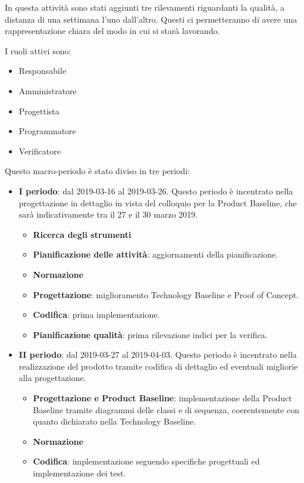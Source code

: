 		In questa attività sono stati aggiunti tre rilevamenti riguardanti la qualità, a distanza di una settimana l'uno
		dall'altro. Questi ci permetteranno di avere una rappresentazione chiara del modo in cui si starà lavorando.

        I ruoli attivi sono:
        \begin{itemize}
            \item Responsabile
            \item Amministratore
            \item Progettista
            \item Programmatore
            \item Verificatore
        \end{itemize}
        Questo macro-periodo è stato diviso in tre periodi:
		\begin{itemize}
			\item \textbf{I periodo}: dal 2019-03-16 al 2019-03-26. Questo periodo è incentrato nella progettazione in dettaglio
				in vista del colloquio per la Product Baseline, che sarà indicativamente tra il 27 e il 30 marzo 2019.
			\begin{itemize}
    	        \item \textbf{Ricerca degli strumenti}
    	        \item \textbf{Pianificazione delle attività}: aggiornamenti della pianificazione.
    	        \item \textbf{Normazione}
    	        \item \textbf{Progettazione}: miglioramento Technology Baseline e Proof of Concept.
    	        \item \textbf{Codifica}: prima implementazione.
    	        \item \textbf{Pianificazione qualità}: prima rilevazione indici per la verifica.
        	\end{itemize}
			\item \textbf{II periodo}: dal 2019-03-27 al 2019-04-03. Questo periodo è incentrato nella realizzazione del prodotto tramite
				codifica di dettaglio ed eventuali migliorie alla progettazione.
			\begin{itemize}
				\item \textbf{Progettazione e Product Baseline}: implementazione della Product Baseline tramite diagrammi delle
				classi e di sequenza, coerentemente con quanto dichiarato nella Technology Baseline.
    	        \item \textbf{Normazione}
    	        \item \textbf{Codifica}: implementazione seguendo specifiche progettuali ed implementazione dei test.

\end{itemize}
\end{itemize}
